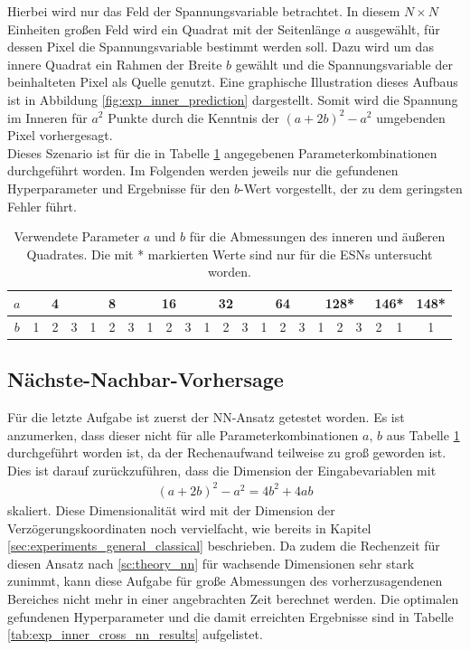 Hierbei wird nur das Feld der Spannungsvariable betrachtet. In diesem $N \times N$ Einheiten großen Feld wird ein Quadrat mit der Seitenlänge $a$ ausgewählt, für dessen Pixel die Spannungsvariable bestimmt werden soll. Dazu wird um das innere Quadrat ein Rahmen der Breite $b$ gewählt und die Spannungsvariable der beinhalteten Pixel als Quelle genutzt. Eine graphische Illustration dieses Aufbaus ist in Abbildung \ref{fig:exp_inner_prediction} dargestellt. Somit wird die Spannung im Inneren für $a^2$ Punkte durch die Kenntnis der $(a+2b)^2-a^2$ umgebenden Pixel vorhergesagt.\\

Dieses Szenario ist für die in Tabelle \ref{tab:exp_inner_cross_pred_parameter} angegebenen Parameterkombinationen durchgeführt worden. Im Folgenden werden jeweils nur die gefundenen Hyperparameter und Ergebnisse für den $b$-Wert vorgestellt, der zu dem geringsten Fehler führt.

\begin{table}[h]
	\centering
	\begin{tabular}{cccc|ccc|ccc|ccc|ccc|ccc|cc|c}
		\hline
		$a$ & \multicolumn{3}{c|}{4} & \multicolumn{3}{c|}{8} & \multicolumn{3}{c|}{16} & \multicolumn{3}{c|}{32} & \multicolumn{3}{c|}{64} & \multicolumn{3}{c|}{128*} & \multicolumn{2}{c|}{146*} & 148* \\
		\hline
		$b$ & 1 & 2 & 3 & 1 & 2 & 3 & 1 & 2 & 3 & 1 & 2 & 3 & 1 & 2 & 3 & 1 & 2 & 3 & 2 & 1 & 1 \\
		\hline
	\end{tabular} 
	\caption{Verwendete Parameter $a$ und $b$ für die Abmessungen des inneren und äußeren Quadrates. Die mit * markierten Werte sind nur für die \textsc{ESN}s untersucht worden.}
	\label{tab:exp_inner_cross_pred_parameter}
\end{table} 

\subsection{Nächste-Nachbar-Vorhersage}
Für die letzte Aufgabe ist zuerst der \textsc{NN}-Ansatz getestet worden. Es ist anzumerken, dass dieser nicht für alle Parameterkombinationen $a$, $b$ aus Tabelle \ref{tab:exp_inner_cross_pred_parameter} durchgeführt worden ist, da der Rechenaufwand teilweise zu groß geworden ist. Dies ist darauf zurückzuführen, dass die Dimension der Eingabevariablen mit
\begin{align*}
(a+2b)^2-a^2 = 4b^2+4ab
\end{align*}
skaliert. Diese Dimensionalität wird mit der Dimension der Verzögerungskoordinaten noch vervielfacht, wie bereits in Kapitel \ref{sec:experiments_general_classical} beschrieben. Da zudem die Rechenzeit für diesen Ansatz nach \ref{sc:theory_nn} für wachsende Dimensionen sehr stark zunimmt, kann diese Aufgabe für große Abmessungen des vorherzusagendenen Bereiches nicht mehr in einer angebrachten Zeit berechnet werden.
Die optimalen gefundenen Hyperparameter und die damit erreichten Ergebnisse sind in Tabelle \ref{tab:exp_inner_cross_nn_results} aufgelistet.

